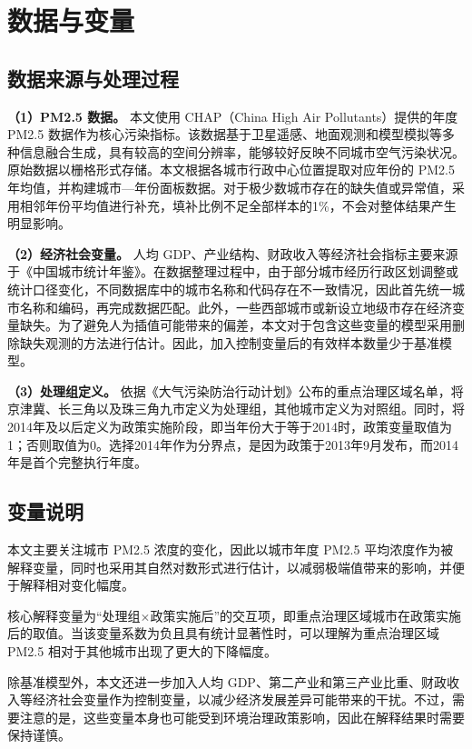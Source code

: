 \documentclass[12pt]{article}
\begin{document}
\section{数据与变量}

\subsection{数据来源与处理过程}

\textbf{（1）PM2.5 数据。} 本文使用 CHAP（China High Air Pollutants）提供的年度 PM2.5 数据作为核心污染指标。该数据基于卫星遥感、地面观测和模型模拟等多种信息融合生成，具有较高的空间分辨率，能够较好反映不同城市空气污染状况。原始数据以栅格形式存储。本文根据各城市行政中心位置提取对应年份的 PM2.5 年均值，并构建城市—年份面板数据。对于极少数城市存在的缺失值或异常值，采用相邻年份平均值进行补充，填补比例不足全部样本的1\%，不会对整体结果产生明显影响。

\textbf{（2）经济社会变量。} 人均 GDP、产业结构、财政收入等经济社会指标主要来源于《中国城市统计年鉴》。在数据整理过程中，由于部分城市经历行政区划调整或统计口径变化，不同数据库中的城市名称和代码存在不一致情况，因此首先统一城市名称和编码，再完成数据匹配。此外，一些西部城市或新设立地级市存在经济变量缺失。为了避免人为插值可能带来的偏差，本文对于包含这些变量的模型采用删除缺失观测的方法进行估计。因此，加入控制变量后的有效样本数量少于基准模型。

\textbf{（3）处理组定义。} 依据《大气污染防治行动计划》公布的重点治理区域名单，将京津冀、长三角以及珠三角九市定义为处理组，其他城市定义为对照组。同时，将2014年及以后定义为政策实施阶段，即当年份大于等于2014时，政策变量取值为1；否则取值为0。选择2014年作为分界点，是因为政策于2013年9月发布，而2014年是首个完整执行年度。

\subsection{变量说明}

本文主要关注城市 PM2.5 浓度的变化，因此以城市年度 PM2.5 平均浓度作为被解释变量，同时也采用其自然对数形式进行估计，以减弱极端值带来的影响，并便于解释相对变化幅度。

核心解释变量为``处理组$\times$政策实施后''的交互项，即重点治理区域城市在政策实施后的取值。当该变量系数为负且具有统计显著性时，可以理解为重点治理区域 PM2.5 相对于其他城市出现了更大的下降幅度。

除基准模型外，本文还进一步加入人均 GDP、第二产业和第三产业比重、财政收入等经济社会变量作为控制变量，以减少经济发展差异可能带来的干扰。不过，需要注意的是，这些变量本身也可能受到环境治理政策影响，因此在解释结果时需要保持谨慎。
\end{document}
